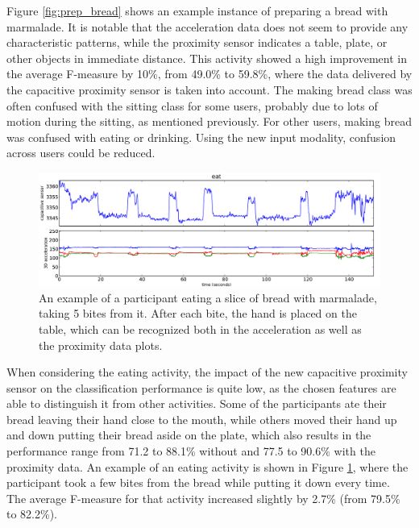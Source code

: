 \documentclass[runningheads,a4paper]{llncs}
\begin{document}
Figure \ref{fig:prep_bread} shows an example instance of preparing a bread with marmalade. It is notable that the acceleration data does not seem to provide any characteristic patterns, while the proximity sensor indicates a table, plate, or other objects in immediate distance. This activity showed a high improvement in the average F-measure by 10\%, from 49.0\% to 59.8\%, where the data delivered by the capacitive proximity sensor is taken into account. The making bread class was often confused with the sitting class for some users, probably due to lots of motion during the sitting, as mentioned previously. For other users, making bread was confused with eating or drinking. Using the new input modality, confusion across users could be reduced.

\begin{figure}
	\centering
		\includegraphics[width=\textwidth]{../Auswertung/images/eugen_6.pdf}
	\caption{An example of a participant eating a slice of bread with marmalade, taking 5 bites from it. After each bite, the hand is placed on the table, which can be recognized both in the acceleration as well as the proximity data plots.}
	\label{fig:eating}
\end{figure}

When considering the eating activity, the impact of the new capacitive proximity sensor on the classification performance is quite low, as the chosen features are able to distinguish it from other activities. Some of the participants ate their bread leaving their hand close to the mouth, while others moved their hand up and down putting their bread aside on the plate, which also results in the performance range from 71.2 to 88.1\% without and 77.5 to 90.6\% with the proximity data. An example of an eating activity is shown in Figure \ref{fig:eating}, where the participant took a few bites from the bread while putting it down every time. The average F-measure for that activity increased slightly by 2.7\% (from 79.5\% to 82.2\%). 
\end{document}
